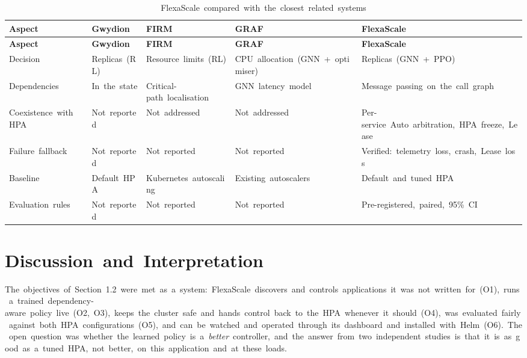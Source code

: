 \documentclass[12pt,a4paper,oneside]{report}
\begin{document}
\begingroup\small\setlength{\tabcolsep}{4pt}\renewcommand{\arraystretch}{1.25}
\begin{longtable}{|>{\raggedright\arraybackslash}p{2.78cm}|>{\raggedright\arraybackslash}p{2.50cm}|>{\raggedright\arraybackslash}p{2.50cm}|>{\raggedright\arraybackslash}p{2.78cm}|>{\raggedright\arraybackslash}p{3.34cm}|}
\caption{FlexaScale~compared~with~the~closest~related~systems}\label{tab:compare}\\\hline
\textbf{Aspect} & \textbf{Gwydion~\cite{gwydion}} & \textbf{FIRM~\cite{firm}} & \textbf{GRAF~\cite{graf}} & \textbf{FlexaScale}\\\hline\endfirsthead
\hline \textbf{Aspect} & \textbf{Gwydion~\cite{gwydion}} & \textbf{FIRM~\cite{firm}} & \textbf{GRAF~\cite{graf}} & \textbf{FlexaScale}\\\hline\endhead
Decision & Replicas~(RL) & Resource~limits~(RL) & CPU~allocation~(GNN~+~optimiser) & Replicas~(GNN~+~PPO)\\\hline
Dependencies & In~the~state & Critical-path~localisation & GNN~latency~model & Message~passing~on~the~call~graph\\\hline
Coexistence~with~HPA & Not~reported & Not~addressed & Not~addressed & Per-service~Auto~arbitration,~HPA~freeze,~Lease\\\hline
Failure~fallback & Not~reported & Not~reported & Not~reported & Verified:~telemetry~loss,~crash,~Lease~loss\\\hline
Baseline & Default~HPA & Kubernetes~autoscaling & Existing~autoscalers & Default~and~tuned~HPA\\\hline
Evaluation~rules & Not~reported & Not~reported & Not~reported & Pre-registered,~paired,~95\%~CI\\\hline
\end{longtable}\endgroup

\section{Discussion~and~Interpretation}

The~objectives~of~Section~1.2~were~met~as~a~system:~FlexaScale~discovers~and~controls~applications~it~was~not~written~for~(O1),~runs~a~trained~dependency-aware~policy~live~(O2,~O3),~keeps~the~cluster~safe~and~hands~control~back~to~the~HPA~whenever~it~should~(O4),~was~evaluated~fairly~against~both~HPA~configurations~(O5),~and~can~be~watched~and~operated~through~its~dashboard~and~installed~with~Helm~(O6).~The~open~question~was~whether~the~learned~policy~is~a~\textit{better}~controller,~and~the~answer~from~two~independent~studies~is~that~it~is~as~good~as~a~tuned~HPA,~not~better,~on~this~application~and~at~these~loads.
\end{document}
